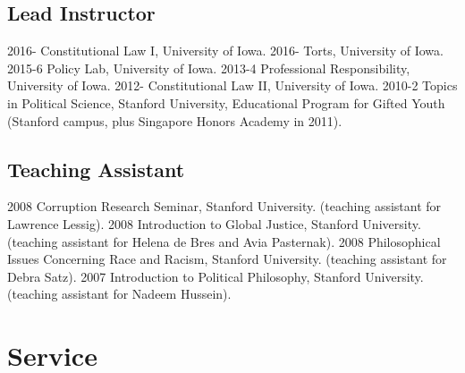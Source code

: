 \documentclass[letterpaper]{moderncv}
\begin{document}
\subsection{Lead Instructor}
\cvitem
{2016-}
{Constitutional Law I, University of Iowa.}
\vspace{1mm}
\cvitem
{2016-}
{Torts, University of Iowa.}
\vspace{1mm}
\cvitem
{2015-6}
{Policy Lab, University of Iowa.}
\vspace{1mm}
\cvitem
{2013-4}
{Professional Responsibility, University of Iowa.}
\vspace{1mm}
\cvitem
{2012-}
{Constitutional Law II, University of Iowa.}
\vspace{1mm}
\cvitem
{2010-2}
{Topics in Political Science, Stanford University, Educational Program for Gifted Youth (Stanford campus, plus Singapore Honors Academy in 2011).}
\vspace{1mm}
\subsection{Teaching Assistant}
\cvitem
{2008}
{Corruption Research Seminar, Stanford University.
  \newline
  (teaching assistant for Lawrence Lessig).
}
\vspace{1mm}
\cvitem
{2008}
{Introduction to Global Justice, Stanford University.
  \newline
  (teaching assistant for Helena de Bres and Avia Pasternak).
}
\vspace{1mm}
\cvitem
{2008}
{Philosophical Issues Concerning Race and Racism, Stanford University.
  \newline
  (teaching assistant for Debra Satz).
}
\vspace{1mm}
\cvitem
{2007}
{Introduction to Political Philosophy, Stanford University.
  \newline
  (teaching assistant for Nadeem Hussein).
}
\vspace{1mm}

\section{Service}
\end{document}

